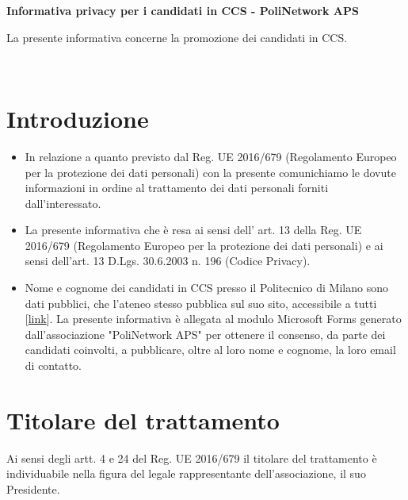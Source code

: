 \documentclass[legalpaper, 11pt]{exam}
\begin{document}

{


\begin{center}
{\textbf{Informativa privacy per i candidati in CCS - PoliNetwork APS}}

\end{center}

\vspace{1pt}

\noindent
La presente informativa concerne la promozione dei candidati in CCS.

\vspace{10pt}
~\\
\noindent

\section*{Introduzione}
\begin{itemize}
	\item 

In relazione a quanto previsto dal Reg. UE 2016/679 (Regolamento Europeo per la protezione dei dati personali) con la presente comunichiamo le dovute informazioni in ordine al trattamento dei dati personali forniti dall’interessato.
\item
La presente informativa che è resa ai sensi dell’ art. 13 della Reg. UE 2016/679 (Regolamento Europeo per la protezione dei dati personali) e ai sensi dell’art. 13 D.Lgs. 30.6.2003 n. 196 (Codice Privacy).
\item
Nome e cognome dei candidati in CCS presso il Politecnico di Milano sono dati pubblici, che l'ateneo stesso pubblica sul suo sito, accessibile a tutti [\href{https://www.polimi.it/fileadmin/user_upload/il_Politecnico/votazioni-studenti/Comunicato_Candidature.pdf}{link}]. 
La presente informativa è allegata al modulo Microsoft Forms generato dall'associazione "PoliNetwork APS" per ottenere il consenso, da parte dei candidati coinvolti, a pubblicare, oltre al loro nome e cognome, la loro email di contatto.
\end{itemize}

\section{Titolare del trattamento}
Ai sensi degli artt. 4 e 24 del Reg. UE 2016/679 il titolare del trattamento è individuabile nella figura del legale rappresentante dell'associazione, il suo Presidente.

}
\end{document}
